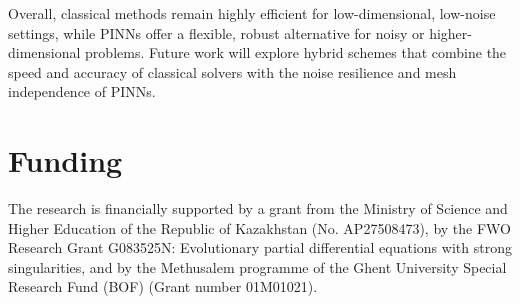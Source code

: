 \documentclass[reqno]{amsart}
\begin{document}
Overall, classical methods remain highly efficient for low-dimensional, low-noise settings, while PINNs offer a flexible, robust alternative for noisy or higher-dimensional problems. Future work will explore hybrid schemes that combine the speed and accuracy of classical solvers with the noise resilience and mesh independence of PINNs.

\section*{Funding}
\noindent
The research is financially supported by a grant from the
Ministry of Science and Higher Education of the Republic of Kazakhstan (No. AP27508473), by the FWO Research Grant G083525N: Evolutionary partial differential equations with strong singularities, and by the Methusalem programme of the Ghent University Special Research Fund (BOF) (Grant number 01M01021).
\end{document}
